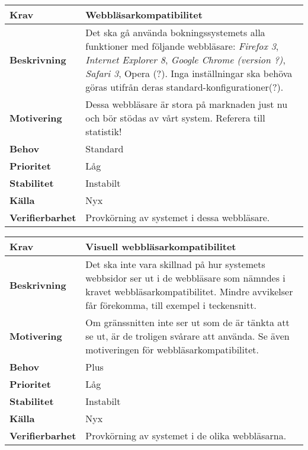\documentclass[a4paper, twoside, 11pt, titlepage]{article}
\begin{document}
		\begin{tabular} { p{2.6cm} p{12.5cm} }
			\hline
			\sffamily\textbf{Krav} & Webbläsarkompatibilitet  \\
			\hline
			\sffamily\textbf{Beskrivning} & Det ska gå använda bokningssystemets alla funktioner med följande webbläsare: \emph{Firefox 3}, \emph{Internet Explorer 8}, \emph{Google Chrome (version ?)}, \emph{Safari 3}, Opera (?). Inga inställningar ska behöva göras utifrån deras standard-konfigurationer(?).  \\
			\hline
			\sffamily\textbf{Motivering} & Dessa webbläsare är stora på marknaden just nu och bör stödas av vårt system. Referera till statistik!  \\
			\hline
			\sffamily\textbf{Behov} & Standard  \\
			\hline
			\sffamily\textbf{Prioritet} & Låg  \\
			\hline
			\sffamily\textbf{Stabilitet} & Instabilt  \\
			\hline
			\sffamily\textbf{Källa} & Nyx  \\
			\hline
			\sffamily\textbf{Verifierbarhet} & Provkörning av systemet i dessa webbläsare.  \\
			\hline
		\end{tabular}
		\vspace{6mm}

		\begin{tabular} { p{2.6cm} p{12.5cm} }
			\hline
			\sffamily\textbf{Krav} & Visuell webbläsarkompatibilitet  \\
			\hline
			\sffamily\textbf{Beskrivning} & Det ska inte vara skillnad på hur systemets webbsidor ser ut i de webbläsare som nämndes i kravet webbläsarkompatibilitet. Mindre avvikelser får förekomma, till exempel i teckensnitt.  \\
			\hline
			\sffamily\textbf{Motivering} & Om gränssnitten inte ser ut som de är tänkta att se ut, är de troligen svårare att använda. Se även motiveringen för webbläsarkompatibilitet.  \\
			\hline
			\sffamily\textbf{Behov} & Plus  \\
			\hline
			\sffamily\textbf{Prioritet} & Låg  \\
			\hline
			\sffamily\textbf{Stabilitet} & Instabilt  \\
			\hline
			\sffamily\textbf{Källa} & Nyx  \\
			\hline
			\sffamily\textbf{Verifierbarhet} & Provkörning av systemet i de olika webbläsarna.  \\
			\hline
		\end{tabular}
		\vspace{6mm}
\end{document}
